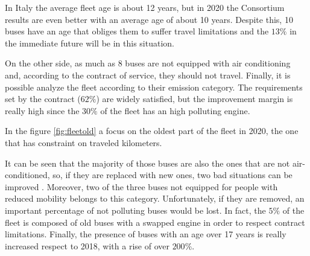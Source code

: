 In Italy the average fleet age is about 12 years\cite{rossiPTM}, but in 2020 the Consortium results are even better with an average age of about 10 years. Despite this, 10 buses have an age that obliges them to suffer travel limitations and the $13\%$ in the immediate future will be in this situation. 

On the other side, as much as 8 buses are not equipped with air conditioning and, according to the contract of service, they should not travel. Finally, it is possible analyze the fleet according to their emission category. The requirements set by the contract ($62\%$) are widely satisfied, but the improvement margin is really high since the $30\%$ of the fleet has an high polluting engine. 


\newpage
\begin{landscape}
\thispagestyle{empty}

\end{landscape}
\newpage

In the figure \ref{fig:fleetold}  a focus on the oldest part of the fleet in 2020, the one that has constraint on traveled kilometers. 

It can be seen that the majority of those buses are also the ones that are not air-conditioned, so, if they are replaced with new ones, two bad situations can be improved . Moreover, two of the three buses not equipped for people with reduced mobility belongs to this category. Unfortunately, if they are removed, an important percentage of not polluting buses would be lost. In fact, the $5\%$ of the fleet is composed of old buses with a swapped engine in order to respect contract limitations. Finally, the presence of buses with an age over 17 years is really increased respect to 2018, with a rise of over $200\%$.


